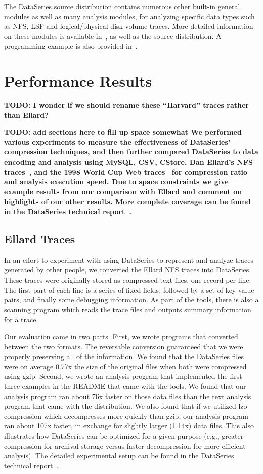 \documentclass{acm_proc_article-sp}
\begin{document}
The DataSeries source distribution contains numerous other built-in 
general modules as well as many analysis modules, for analyzing
specific data types such as NFS, LSF and logical/physical disk volume
traces.  More detailed information on these modules is available 
in~\cite{DSTechnicalReportSnapshot}, as well as the source distribution.
A programming example is also provided in~\cite{DSTechnicalReportSnapshot}.

\section{Performance Results}\label{sec:results}

{\bf TODO: I wonder if we should rename these ``Harvard'' traces
rather than Ellard?}
{\bf TODO: add sections here to fill up space somewhat
We performed various experiments to measure the effectiveness of
DataSeries' compression techniques, and then further compared
DataSeries to data encoding and analysis using MySQL, CSV, CStore,
Dan Ellard's NFS traces~\cite{ellard03}, and the 1998 World Cup Web
traces~\cite{ita-wcweb98} for compression ratio and analysis execution speed.
Due to space constraints we give example results from our
comparison with Ellard and comment on highlights of our other results.
  More complete coverage can be found in the
DataSeries technical report~\cite{DSTechnicalReportSnapshot}.

\subsection{Ellard Traces}\label{sec:ellard}

In an effort to experiment with using DataSeries to represent and
analyze traces generated by other people, we converted the Ellard NFS
traces into DataSeries.  These traces
were originally stored as compressed text files, one record per line.
The first part of each line is a series of fixed fields, followed by a
set of key-value pairs, and finally some debugging information.  As
part of the tools, there is also a scanning program which reads the
trace files and outputs summary information for a trace.

Our evaluation came in two parts.  First, we wrote programs that
converted between the two formats.  The reversable conversion
guaranteed that we were properly preserving all of the information.
We found that the DataSeries files were on average 0.77x the size of
the original files when both were compressed using gzip.  Second, we
wrote an analysis program that implemented the first three examples in
the README that came with the tools.  We found that our analysis
program ran about 76x faster on those data files than the text
analysis program that came with the distribution.  We also found that
if we utilized lzo compression which decompresses more quickly than
gzip, our analysis program ran about 107x faster, in exchange for
slightly larger (1.14x) data files.  This also illustrates how
DataSeries can be optimized for a given purpose (e.g., greater
compression for archival storage versus faster decompression for more
efficient analysis). The detailed experimental setup can be found in
the DataSeries technical report~\cite{DSTechnicalReportSnapshot}.


}
\end{document}
